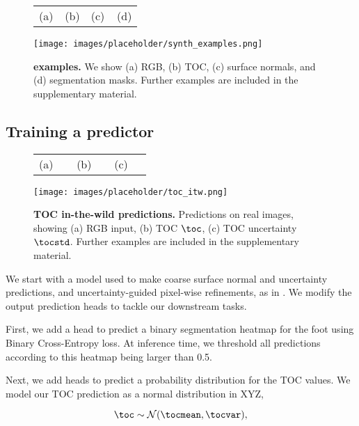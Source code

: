 \begin{figure}
    \centering

    \begin{tabular}{*{4}{@{}Q{0.25\linewidth}}@{}}
    (a) & (b) &  (c) & (d)
    \end{tabular}

    \texttt{[image: images/placeholder/synth\_examples.png]}
    \caption{\textbf{\ourSynth examples.} We show (a) RGB, (b) TOC, (c) surface normals, and (d) segmentation masks. Further examples are included in the supplementary material.}
    \label{fig:synth_examples}
\end{figure}

\subsection{Training a predictor}
\label{sec:predictor}

\begin{figure}
    \begin{tabular}{*{3}{@{}Q{0.237\linewidth}}@{}}
    (a) & (b) & (c)
    \end{tabular}

    \centering
    \texttt{[image: images/placeholder/toc\_itw.png]}
        \caption{\textbf{TOC in-the-wild predictions.} Predictions on real images, showing (a) RGB input, (b) TOC $\toc$, (c) TOC uncertainty $\tocstd$. Further examples are included in the supplementary material.}
    \label{fig:toc_itw}
\end{figure}

\def\tunc{\tau}

We start with a model used to make coarse surface normal and uncertainty predictions, and uncertainty-guided pixel-wise refinements, as in \cite{alhashim2018high, bae2021estimating}. We modify the output prediction heads to tackle our downstream tasks.

First, we add a head to predict a binary segmentation heatmap for the foot using Binary Cross-Entropy loss. At inference time, we threshold all predictions according to this heatmap being larger than 0.5.

Next, we add heads to predict a probability distribution for the TOC values.
We model our TOC prediction as a normal distribution in XYZ,

\begin{equation}
    \toc \sim \mathcal{N}(\tocmean, \tocvar),
\end{equation}

